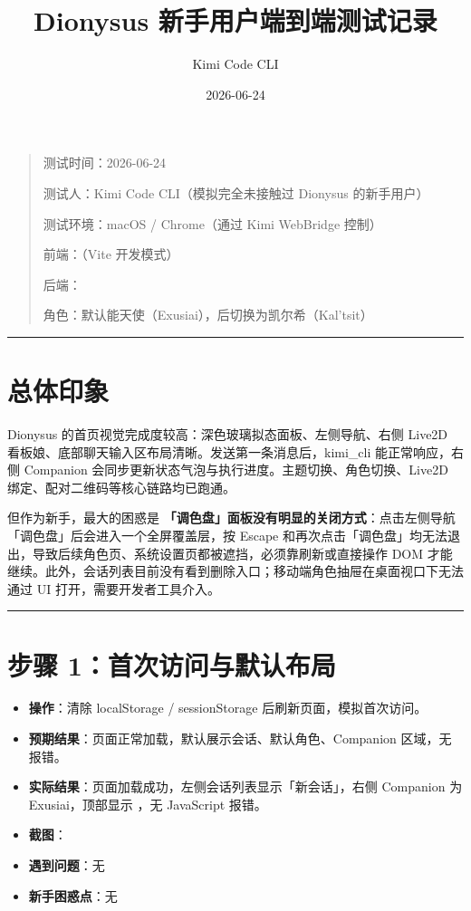 \documentclass[12pt,a4paper]{ctexart}
\begin{document}
\title{Dionysus 新手用户端到端测试记录}
\author{Kimi Code CLI}
\date{2026-06-24}
\maketitle


\begin{quote}
测试时间：2026-06-24\par
测试人：Kimi Code CLI（模拟完全未接触过 Dionysus 的新手用户）\par
测试环境：macOS / Chrome（通过 Kimi WebBridge 控制）\par
前端：（Vite 开发模式）\par
后端：\par
角色：默认能天使（Exusiai），后切换为凯尔希（Kal'tsit）\par
\end{quote}

\hrule


\section{总体印象}

Dionysus 的首页视觉完成度较高：深色玻璃拟态面板、左侧导航、右侧 Live2D 看板娘、底部聊天输入区布局清晰。发送第一条消息后，kimi\_cli 能正常响应，右侧 Companion 会同步更新状态气泡与执行进度。主题切换、角色切换、Live2D 绑定、配对二维码等核心链路均已跑通。\par

但作为新手，最大的困惑是 \textbf{「调色盘」面板没有明显的关闭方式}：点击左侧导航「调色盘」后会进入一个全屏覆盖层，按 Escape 和再次点击「调色盘」均无法退出，导致后续角色页、系统设置页都被遮挡，必须靠刷新或直接操作 DOM 才能继续。此外，会话列表目前没有看到删除入口；移动端角色抽屉在桌面视口下无法通过 UI 打开，需要开发者工具介入。\par

\hrule


\section{步骤 1：首次访问与默认布局}

\begin{itemize}[leftmargin=2em]
\item \textbf{操作}：清除 localStorage / sessionStorage 后刷新页面，模拟首次访问。
\item \textbf{预期结果}：页面正常加载，默认展示会话、默认角色、Companion 区域，无报错。
\item \textbf{实际结果}：页面加载成功，左侧会话列表显示「新会话」，右侧 Companion 为 Exusiai，顶部显示 ，无 JavaScript 报错。
\item \textbf{截图}：
\item \textbf{遇到问题}：无
\item \textbf{新手困惑点}：无
\end{itemize}
\end{document}
